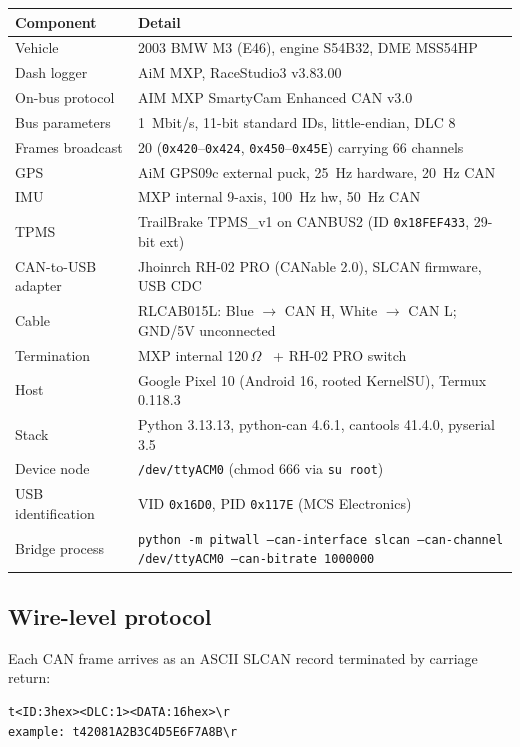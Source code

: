 \documentclass[11pt,a4paper]{article}
\newcommand{\ok}{\textcolor{ok}{\checkmark}}
\newcommand{\hex}[1]{\texttt{0x#1}}
\begin{document}
\begin{tabular}{@{}ll@{}}
\toprule
Component & Detail \\
\midrule
Vehicle              & 2003 BMW M3 (E46), engine S54B32, DME MSS54HP \\
Dash logger          & AiM MXP, RaceStudio3 v3.83.00 \\
On-bus protocol      & AIM MXP SmartyCam Enhanced CAN v3.0 \\
Bus parameters       & \SI{1}{Mbit/s}, 11-bit standard IDs, little-endian, DLC 8 \\
Frames broadcast     & 20 (\hex{420}--\hex{424}, \hex{450}--\hex{45E}) carrying 66 channels \\
GPS                  & AiM GPS09c external puck, \SI{25}{Hz} hardware, \SI{20}{Hz} CAN \\
IMU                  & MXP internal 9-axis, \SI{100}{Hz} hw, \SI{50}{Hz} CAN \\
TPMS                 & TrailBrake TPMS\_v1 on CANBUS2 (ID \hex{18FEF433}, 29-bit ext) \\
CAN-to-USB adapter   & Jhoinrch RH-02 PRO (CANable 2.0), SLCAN firmware, USB CDC \\
Cable                & RLCAB015L: Blue $\to$ CAN H, White $\to$ CAN L; GND/5V unconnected \\
Termination          & MXP internal 120\,$\Omega$ \ok\ + RH-02 PRO switch \ok \\
Host                 & Google Pixel 10 (Android 16, rooted KernelSU), Termux 0.118.3 \\
Stack                & Python 3.13.13, python-can 4.6.1, cantools 41.4.0, pyserial 3.5 \\
Device node          & \texttt{/dev/ttyACM0} (chmod 666 via \texttt{su root}) \\
USB identification   & VID \hex{16D0}, PID \hex{117E} (MCS Electronics) \\
Bridge process       & \texttt{python -m pitwall --can-interface slcan --can-channel /dev/ttyACM0 --can-bitrate 1000000} \\
\bottomrule
\end{tabular}

\subsection{Wire-level protocol}

Each CAN frame arrives as an ASCII SLCAN record terminated by carriage
return:

\begin{lstlisting}
t<ID:3hex><DLC:1><DATA:16hex>\r
example: t42081A2B3C4D5E6F7A8B\r
\end{lstlisting}
\end{document}
